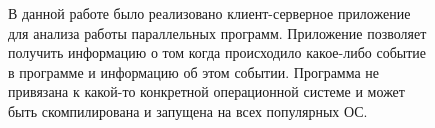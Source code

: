 \Conclusion %

\begin{figure}
В данной работе было реализовано клиент-серверное приложение для анализа работы параллельных программ. Приложение позволяет получить информацию о том когда происходило какое-либо событие в программе и информацию об этом событии. Программа не привязана к какой-то конкретной
операционной системе и может быть скомпилирована и запущена на всех популярных ОС.
\end{figure}
